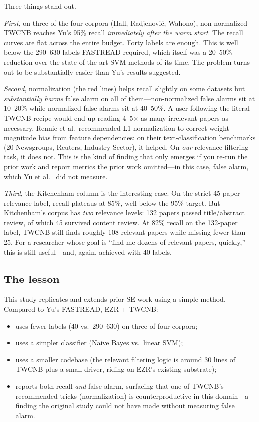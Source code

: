 Three things stand out.

{\em First}, on three of the four corpora (Hall,
Radjenovi\'c, Wahono), non-normalized TWCNB reaches Yu's
95\% recall {\em immediately after the warm start}. The
recall curves are flat across the entire budget. Forty
labels are enough. This is well below the 290--630 labels
FASTREAD required, which itself was a 20--50\% reduction
over the state-of-the-art SVM methods of its time. The
problem turns out to be substantially easier than Yu's
results suggested.

{\em Second}, normalization (the red lines) helps recall
slightly on some datasets but {\em substantially harms}
false alarm on all of them---non-normalized false alarms
sit at 10--20\% while normalized false alarms sit at
40--50\%. A user following the literal TWCNB recipe would
end up reading 4--5$\times$ as many irrelevant papers as
necessary. Rennie et al.\ recommended L1 normalization to
correct weight-magnitude bias from feature dependencies; on
their text-classification benchmarks (20 Newsgroups, Reuters,
Industry Sector), it helped. On {\em our} relevance-filtering
task, it does not. This is the kind of finding that only
emerges if you re-run the prior work and report metrics the
prior work omitted---in this case, false alarm, which Yu et
al.~\cite{yu2018finding} did not measure.

{\em Third}, the Kitchenham column is the interesting case.
On the strict 45-paper relevance label, recall plateaus at
85\%, well below the 95\% target. But Kitchenham's corpus
has {\em two} relevance levels: 132 papers passed
title/abstract review, of which 45 survived content review.
At 82\% recall on the 132-paper label, TWCNB still finds
roughly 108 relevant papers while missing fewer than 25.
For a researcher whose goal is ``find me dozens of relevant
papers, quickly,'' this is still useful---and, again,
achieved with 40 labels.

\subsection*{The lesson}

This study replicates and extends prior SE work using a
simple method. Compared to Yu's FASTREAD, EZR + TWCNB:
\begin{itemize}
\item uses fewer labels (40 vs.\ 290--630) on three of four
corpora;
\item uses a simpler classifier (Naive Bayes vs.\ linear SVM);
\item uses a smaller codebase (the relevant filtering logic
is around 30 lines of TWCNB plus a small driver, riding on
EZR's existing substrate);
\item reports both recall {\em and} false alarm, surfacing
that one of TWCNB's recommended tricks (normalization) is
counterproductive in this domain---a finding the original
study could not have made without measuring false alarm.
\end{itemize}

